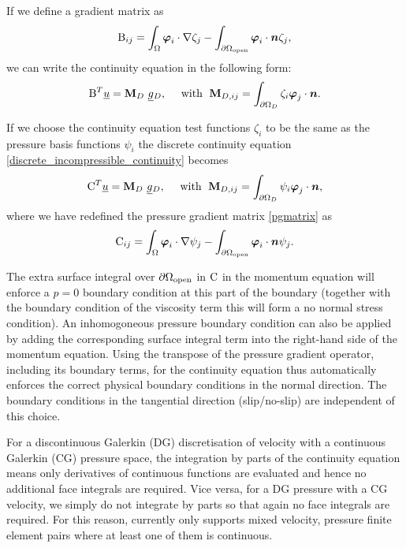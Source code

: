 If we define a gradient matrix as
\begin{equation*}
  \mathrm{B}_{ij}=\int_\Omega {\mbox{\boldmath$\varphi$}}_i\cdot\nabla\zeta_j
    -\int_{{\partial\Omega}_{\mathrm{open}}} {\mbox{\boldmath$\varphi$}}_i\cdot{\mbox{\boldmath$n$}}\zeta_j ,
\end{equation*}
we can write the continuity equation in the following form:
\begin{equation}
  \mathrm{B}^T \underline{u}=
    {\mbox{\boldmath$\mathrm{M}$}}_D ~\underline{g}{}_D,
    \quad\text{ with }\;
    {\mbox{\boldmath$\mathrm{M}$}}_{D,ij}=\int_{{\partial\Omega}_D} \zeta_i{\mbox{\boldmath$\varphi$}}_j\cdot{\mbox{\boldmath$n$}}.
  \label{discrete_incompressible_continuity}
\end{equation}

If we choose the continuity equation test functions $\zeta_{i}$ to be the
same as the pressure basis functions $\psi_i$ the discrete continuity
equation \eqref{discrete_incompressible_continuity} becomes
\begin{equation}
  \mathrm{C}^T \underline{u}=
    {\mbox{\boldmath$\mathrm{M}$}}_D ~\underline{g}{}_D,
    \quad\text{ with }\;
    {\mbox{\boldmath$\mathrm{M}$}}_{D,ij}=\int_{{\partial\Omega}_D} \psi_i{\mbox{\boldmath$\varphi$}}_j\cdot{\mbox{\boldmath$n$}},
  \label{discrete_incompressible_continuity_CT}
\end{equation}
where we have redefined the pressure gradient matrix \eqref{pgmatrix} as
\begin{equation*}
  \mathrm{C}_{ij}=\int_\Omega {\mbox{\boldmath$\varphi$}}_i\cdot\nabla\psi_j
    -\int_{{\partial\Omega}_{\mathrm{open}}} {\mbox{\boldmath$\varphi$}}_i\cdot{\mbox{\boldmath$n$}}\psi_j.
\end{equation*}

The extra surface integral over ${\partial\Omega}_{\mathrm{open}}$ in
$\mathrm{C}$ in the momentum equation will enforce
a $p=0$ boundary condition at this part of the boundary (together with the
boundary condition of the viscosity term this will form a no normal stress
condition). An inhomogoneous pressure boundary condition can also
be applied by adding the corresponding
surface integral term into the right-hand side of the momentum equation.
Using the transpose of the pressure gradient operator, including its
boundary terms, for the continuity equation thus automatically
enforces the correct physical boundary conditions in the normal
direction.
The boundary
conditions in the tangential direction (slip/no-slip) are independent of this choice.

For a discontinuous Galerkin (DG) discretisation of velocity with a continuous
Galerkin (CG) pressure space, the integration by parts of the continuity
equation means only derivatives of continuous functions are evaluated and hence
no additional face integrals are required. Vice versa, for a DG pressure with a CG
velocity, we simply do not integrate by parts so that again no face integrals
are required. For this reason, \fluidity currently only supports mixed velocity,
pressure finite element pairs where at least one of them is continuous.

